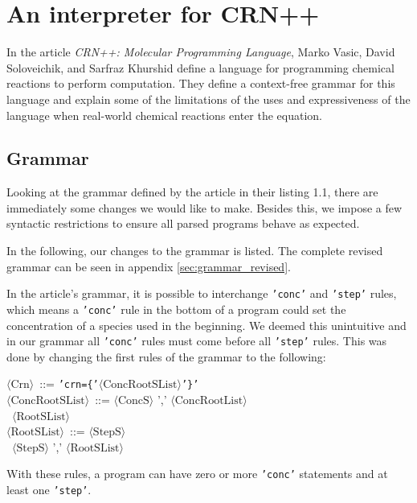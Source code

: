 \section{An interpreter for CRN++}

In the article \textit{CRN++: Molecular Programming Language}, Marko Vasic, David Soloveichik, and Sarfraz Khurshid define a language for programming chemical reactions to perform computation. They define a context-free grammar for this language and explain some of the limitations of the uses and expressiveness of the language when real-world chemical reactions enter the equation. 


\subsection{Grammar}

Looking at the grammar defined by the article in their listing 1.1, there are immediately some changes we would like to make. Besides this, we impose a few syntactic restrictions to ensure all parsed programs behave as expected. 

In the following, our changes to the grammar is listed. The complete revised grammar can be seen in appendix \ref{sec:grammar_revised}. 

In the article's grammar, it is possible to interchange \texttt{'conc'} and \texttt{'step'} rules, which means a \texttt{'conc'} rule in the bottom of a program could set the concentration of a species used in the beginning. We deemed this unintuitive and in our grammar all \texttt{'conc'} rules must come before all \texttt{'step'} rules. This was done by changing the first rules of the grammar to the following:
\begin{tabbing}
    $\langle \text{Crn} \rangle$ \,::=\; \= \texttt{'crn=\{'$\langle \text{ConcRootSList} \rangle$'\}'} \\
    
    $\langle \text{ConcRootSList} \rangle$ \,::=\;  $\langle \text{ConcS} \rangle$ ',' $\langle \text{ConcRootList} \rangle$ \\
    \>\textbar \, $\langle \text{RootSList} \rangle$ \\

    $\langle \text{RootSList} \rangle$ \,::=\;  $\langle \text{StepS} \rangle$ \\
    \>\textbar \, $\langle \text{StepS} \rangle$ ',' $\langle \text{RootSList} \rangle$
\end{tabbing}
With these rules, a program can have zero or more \texttt{'conc'} statements and at least one \texttt{'step'}. 

